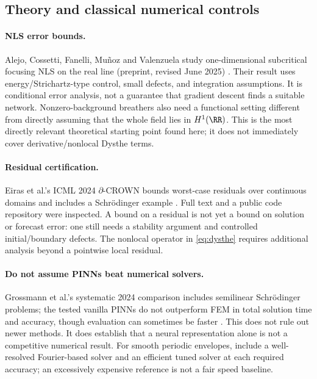 \subsection{Theory and classical numerical controls}
\paragraph{NLS error bounds.}
Alejo, Cossetti, Fanelli, Mu\~noz and Valenzuela study one-dimensional
subcritical focusing NLS on the real line (preprint, revised June 2025)
\cite{alejo}. Their result uses energy/Strichartz-type control, small
defects, and integration assumptions. It is conditional error analysis,
not a guarantee that gradient descent finds a suitable network.
Nonzero-background breathers also need a functional setting different
from directly assuming that the whole field lies in $H^1(\RR)$.
This is the most directly relevant theoretical starting point found here;
it does not immediately cover derivative/nonlocal Dysthe terms.

\paragraph{Residual certification.}
Eiras et al.'s ICML 2024 $\partial$-CROWN bounds worst-case residuals
over continuous domains and includes a Schr\"odinger example
\cite{eiras}. Full text and a public code repository were inspected.
A bound on a residual is not yet a bound on solution or forecast error:
one still needs a stability argument and controlled initial/boundary
defects. The nonlocal operator in \eqref{eq:dysthe} requires additional
analysis beyond a pointwise local residual.

\paragraph{Do not assume PINNs beat numerical solvers.}
Grossmann et al.'s systematic 2024 comparison includes semilinear
Schr\"odinger problems; the tested vanilla PINNs do not outperform FEM in
total solution time and accuracy, though evaluation can sometimes be
faster \cite{grossmann}. This does not rule out newer methods. It does
establish that a neural representation alone is not a competitive
numerical result. For smooth periodic envelopes, include a well-resolved
Fourier-based solver and an efficient tuned solver at each required
accuracy; an excessively expensive reference is not a fair speed baseline.

\clearpage
